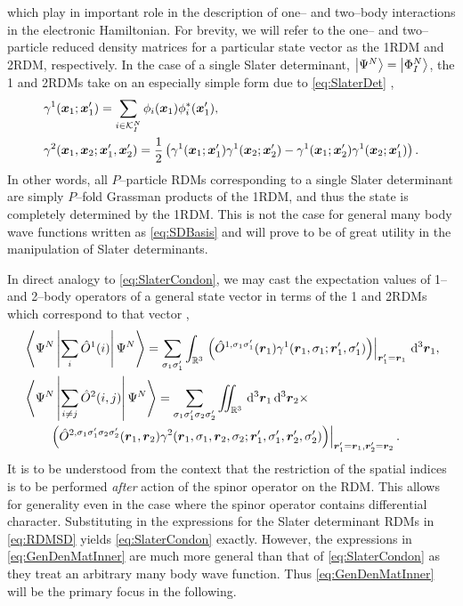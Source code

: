 which play in important role in the description of one-- and two--body interactions in the electronic Hamiltonian. 
For brevity, we will refer to the one-- and two--particle reduced density matrices for a particular state vector 
as the 1RDM and 2RDM, respectively.
In the case of a single Slater determinant, $\left\vert \Psi^N \right\rangle = \left\vert \Phi^N_I \right\rangle$, the 1 and 2RDMs take on an especially simple form due
to \cref{eq:SlaterDet} \cite{Yang89_book},
\begin{align}
  \label{eq:RDMSD}
  &\gamma^1(\boldsymbol{x}_1;\boldsymbol{x}'_1) = \sum_{i \in \mathcal{K}_I^N} \phi_i(\boldsymbol{x}_1) \phi^*_i(\boldsymbol{x}'_1), \\
  &\gamma^2(\boldsymbol{x}_1,\boldsymbol{x}_2; \boldsymbol{x}'_1, \boldsymbol{x}'_2) = 
    \frac{1}{2} \left( \gamma^1(\boldsymbol{x}_1;\boldsymbol{x}'_1)\gamma^1(\boldsymbol{x}_2;\boldsymbol{x}'_2) - \gamma^1(\boldsymbol{x}_1;\boldsymbol{x}'_2)\gamma^1(\boldsymbol{x}_2;\boldsymbol{x}'_1) \right).
\end{align}
In other words, all $P$--particle RDMs corresponding to a single Slater determinant are simply $P$--fold Grassman products of the 1RDM, and thus
the state is completely determined by the 1RDM. This is not the case for general many body wave functions written as \cref{eq:SDBasis} and will
prove to be of great utility in the manipulation of Slater determinants.

In direct analogy to \cref{eq:SlaterCondon}, we may cast the expectation values of 1-- and 2--body operators of a general state vector 
in terms of the 1 and 2RDMs which correspond to that vector
\cite{Yang89_book},
\begin{subequations}
  \label{eq:GenDenMatInner}
\begin{align}
&\left\langle \Psi^N \left\vert \sum_i \hat{O}^1(i) \right\vert \Psi^N \right\rangle = \sum_{\sigma_1\sigma_1'} \int_{\mathbb{R}^3} 
  \left.\left( \hat{O}^{1,\sigma_1\sigma_1'}(\boldsymbol{r}_1) \gamma^1(\boldsymbol{r}_1,\sigma_1; \boldsymbol{r}'_1, \sigma_1') \right) \right \vert_{\boldsymbol{r}'_1 = \boldsymbol{r}_1}
    \,\mathrm{d}^3\boldsymbol{r}_1,\\
&\left\langle \Psi^N \left\vert \sum_{i \neq j} \hat{O}^2(i,j) \right\vert \Psi^N \right\rangle = \sum_{\sigma_1\sigma_1'\sigma_2\sigma_2'}\int\mkern-12mu\int_{\mathbb{R}^3} \,\mathrm{d}^3\boldsymbol{r}_1 \,\mathrm{d}^3\boldsymbol{r}_2  \times\nonumber \\
&\qquad \left.\left( 
    \hat{O}^{2,\sigma_1\sigma_1'\sigma_2\sigma_2'}(\boldsymbol{r}_1,\boldsymbol{r}_2) \gamma^2(\boldsymbol{r}_1,\sigma_1,\boldsymbol{r}_2,\sigma_2; \boldsymbol{r}'_1, \sigma_1',\boldsymbol{r}'_2, \sigma_2')
  \right) \right \vert_{\boldsymbol{r}'_1 = \boldsymbol{r}_1, \boldsymbol{r}'_2 = \boldsymbol{r}_2}. 
\end{align}
\end{subequations}
It is to be understood from the context that the restriction of the spatial indices is to be performed \emph{after} action of the spinor operator
on the RDM. This allows for generality even in the case where the spinor operator contains differential character.
Substituting in the expressions for the Slater determinant RDMs in \cref{eq:RDMSD} yields \cref{eq:SlaterCondon} exactly. However, the expressions in
\cref{eq:GenDenMatInner} are much more general than that of \cref{eq:SlaterCondon} as they treat an arbitrary many body wave function. Thus
\cref{eq:GenDenMatInner} will be the primary focus in the following.

